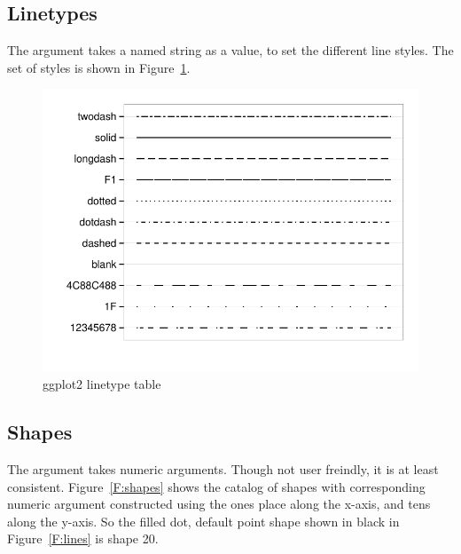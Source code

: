 \documentclass[nojss]{jss}\usepackage[]{graphicx}\usepackage[]{color}
\makeatletter
\def\maxwidth{ %
  \ifdim\Gin@nat@width>\linewidth
    \linewidth
  \else
    \Gin@nat@width
  \fi
}
\newenvironment{knitrout}{}{} %
\makeatother
\begin{document}
\subsection{Linetypes}\label{S:linetypes}
The  argument takes a named string as a value, to set the different line styles. The set of styles is shown in Figure~\ref{F:linetypes}. 
\begin{knitrout}\footnotesize
{}\color{fgcolor}\begin{figure}[htpb]


{\centering \includegraphics[width=\maxwidth]{figure/beamer-linetypes} 

}

\caption[ggplot2 linetype table]{ggplot2 linetype table\label{F:linetypes}}
\end{figure}


\end{knitrout}

\subsection{Shapes}\label{S:shapes}
The  argument takes numeric arguments. Though not user freindly, it is at least consistent. Figure~\ref{F:shapes} shows the catalog of shapes with corresponding numeric argument constructed using the ones place along the x-axis, and tens along the y-axis. So the filled dot, default point shape shown in black in Figure~\ref{F:lines} is shape 20.
\end{document}
